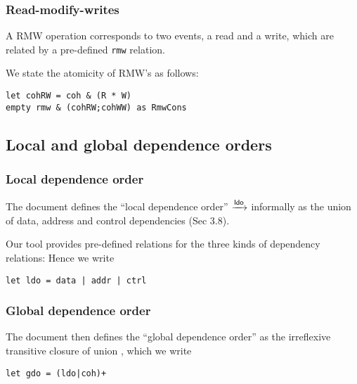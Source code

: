 \documentclass[a4paper]{article}
\begin{document}
\subsubsection{\label{rmw}Read-modify-writes}

A RMW operation corresponds to two events, a read and a write, which are
related by a pre-defined \texttt{rmw} relation.

We state the atomicity of RMW's as follows:
\begin{verbatim}
let cohRW = coh & (R * W)
empty rmw & (cohRW;cohWW) as RmwCons
\end{verbatim}


\subsection{Local and global dependence orders}

\subsubsection{Local dependence order}

The document defines the ``local dependence order'' $\xrightarrow{\textsf{\scriptsize{}ldo}}$ informally as the
union of data, address and control dependencies (Sec 3.8).

Our  tool provides pre-defined relations for the three kinds of
dependency relations:
Hence we write
\begin{verbatim}
let ldo = data | addr | ctrl
\end{verbatim}



\subsubsection{Global dependence order}

The document then defines the ``global dependence order'' as
the irreflexive transitive closure of \ldo{} union \coh{},
which we write
\begin{verbatim}
let gdo = (ldo|coh)+
\end{verbatim}
\end{document}

